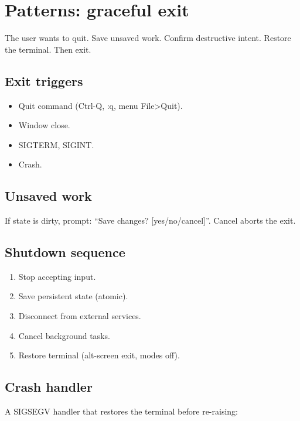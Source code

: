 \chapter{Patterns: graceful exit}
\label{ch:exit}

\begin{aside}
The user wants to quit. Save unsaved work. Confirm
destructive intent. Restore the terminal. Then exit.
\end{aside}

\section{Exit triggers}

\begin{itemize}[leftmargin=*]
  \item Quit command (Ctrl-Q, :q, menu File>Quit).
  \item Window close.
  \item SIGTERM, SIGINT.
  \item Crash.
\end{itemize}

\section{Unsaved work}

If state is dirty, prompt: ``Save changes? [yes/no/cancel]''.
Cancel aborts the exit.

\section{Shutdown sequence}

\begin{enumerate}[leftmargin=*]
  \item Stop accepting input.
  \item Save persistent state (atomic).
  \item Disconnect from external services.
  \item Cancel background tasks.
  \item Restore terminal (alt-screen exit, modes off).
\end{enumerate}

\section{Crash handler}

A SIGSEGV handler that restores the terminal before
re-raising:

